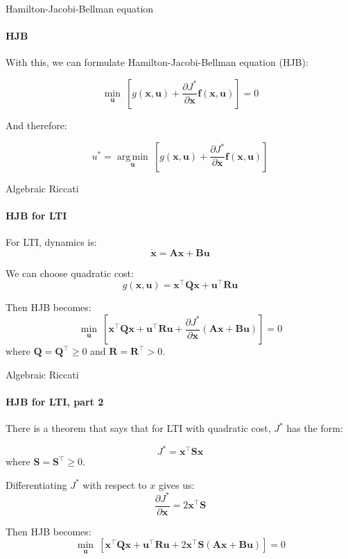 \documentclass{beamer}
\DeclareMathOperator*{\argmin}{arg\,min}
\begin{document}
\begin{frame}{Hamilton-Jacobi-Bellman equation}
\framesubtitle{HJB}
\begin{flushleft}

With this, we can formulate Hamilton-Jacobi-Bellman equation (HJB):

\[
\underset{\mathbf u}{\min} \ [ g(\mathbf x, \mathbf u) + 
\frac{\partial J^*}{\partial \mathbf x} \mathbf f (\mathbf x, \mathbf u) ] = 0
\]

And therefore:

\[
u^* = \underset{\mathbf u}{\argmin} \ [ g(\mathbf x, \mathbf u) + 
\frac{\partial J^*}{\partial \mathbf x} \mathbf f (\mathbf x, \mathbf u) ]
\]

\end{flushleft}
\end{frame}

\begin{frame}{Algebraic Riccati}
\framesubtitle{HJB for LTI}
\begin{flushleft}

For LTI, dynamics is:
\[
\dot {\mathbf x} = \mathbf A  \mathbf x + \mathbf B \mathbf u
\]

We can choose quadratic cost:
\[
g(\mathbf  x, \mathbf  u) = 
\mathbf  x^\top \mathbf Q \mathbf x +
\mathbf  u^\top \mathbf R \mathbf u 
\]

Then HJB becomes:
\[
\underset{\mathbf u}{\min} \ [ 
\mathbf  x^\top \mathbf Q \mathbf x +
\mathbf  u^\top \mathbf R \mathbf u + 
\frac{\partial J^*}{\partial \mathbf x} 
(\mathbf A  \mathbf x + \mathbf B \mathbf u)] = 0
\]
%
where $\mathbf Q = \mathbf Q^\top \geq 0 $ and $\mathbf R = \mathbf R^\top > 0$.

\end{flushleft}
\end{frame}


\begin{frame}{Algebraic Riccati}
\framesubtitle{HJB for LTI, part 2}
\begin{flushleft}

There is a theorem that says that for LTI with quadratic cost, $J^*$ has the form:

\[
J^* = \mathbf  x^\top \mathbf S \mathbf x
\]
%
where $\mathbf S = \mathbf S^\top \geq 0$.

\bigskip

Differentiating  $J^*$ with respect to $x$ gives us:
\[
\frac{\partial J^*}{\partial \mathbf x}  = 2\mathbf x^\top \mathbf S
\]

Then HJB becomes:
\[
\underset{\mathbf u}{\min} \ [ 
\mathbf  x^\top \mathbf Q \mathbf x +
\mathbf  u^\top \mathbf R \mathbf u + 
2\mathbf x^\top \mathbf S
(\mathbf A  \mathbf x + \mathbf B \mathbf u)] = 0
\]

\end{flushleft}
\end{frame}
\end{document}
